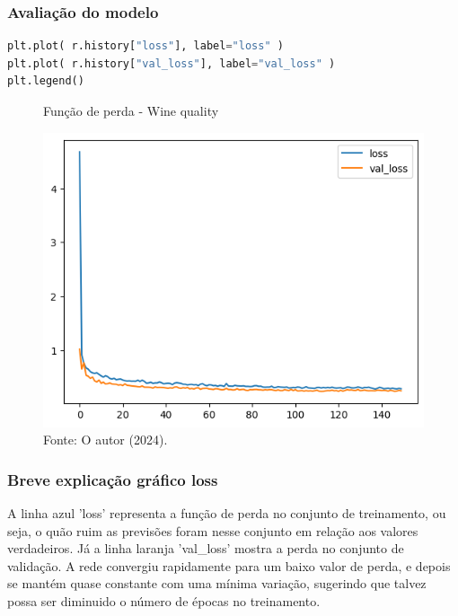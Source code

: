 \subsubsection*{Avaliação do modelo}
\begin{lstlisting}[language=Python, style=input]
plt.plot( r.history["loss"], label="loss" )
plt.plot( r.history["val_loss"], label="val_loss" )
plt.legend()
\end{lstlisting}
\begin{figure}[H]
\centering
\caption{Função de perda - Wine quality}
\includegraphics[width=.8\linewidth]{apendices/fig/13_IAA012_6.png}
\caption*{Fonte: O autor (2024).}
\end{figure}
\subsubsection*{Breve explicação gráfico loss}
A linha azul 'loss' representa a função de perda no conjunto de treinamento, ou seja, o quão ruim as previsões foram nesse conjunto em relação aos valores verdadeiros. Já a linha laranja 'val\_loss' mostra a perda no conjunto de validação. A rede convergiu rapidamente para um baixo valor de perda, e depois se mantém quase constante com uma mínima variação, sugerindo que talvez possa ser diminuido o número de épocas no treinamento.

